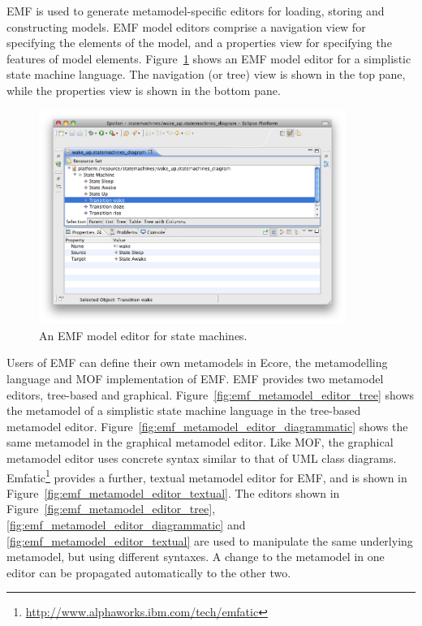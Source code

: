 EMF is used to generate metamodel-specific editors for loading, storing and constructing models. EMF model editors comprise a navigation view for specifying the elements of the model, and a properties view for specifying the features of model elements. Figure~\ref{fig:emf_model_editor} shows an EMF model editor for a simplistic state machine language. The navigation (or tree) view is shown in the top pane, while the properties view is shown in the bottom pane.

\begin{figure}[htbp]
  \begin{center}
    \leavevmode
    \includegraphics[width=10cm]{2.Background/images/emf_model_editor.png}
  \end{center}
  \caption{An EMF model editor for state machines.}
  \label{fig:emf_model_editor}
\end{figure}

Users of EMF can define their own metamodels in Ecore, the metamodelling language and MOF implementation of EMF. EMF provides two metamodel editors, tree-based and graphical. Figure~\ref{fig:emf_metamodel_editor_tree} shows the metamodel of a simplistic state machine language in the tree-based metamodel editor. Figure~\ref{fig:emf_metamodel_editor_diagrammatic} shows the same metamodel in the graphical metamodel editor. Like MOF, the graphical metamodel editor uses concrete syntax similar to that of UML class diagrams. Emfatic\footnote{\url{http://www.alphaworks.ibm.com/tech/emfatic}} provides a further, textual metamodel editor for EMF, and is shown in Figure~\ref{fig:emf_metamodel_editor_textual}. The editors shown in Figure~\ref{fig:emf_metamodel_editor_tree}, \ref{fig:emf_metamodel_editor_diagrammatic} and \ref{fig:emf_metamodel_editor_textual} are used to manipulate the same underlying metamodel, but using different syntaxes. A change to the metamodel in one editor can be propagated automatically to the other two.

